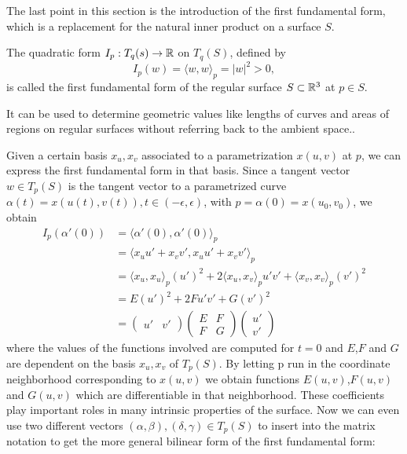 The last point in this section is the introduction of the first fundamental form, which is a replacement for the natural inner product on a surface $S$.
\begin{mydef}
	The quadratic form $I_p : T_q(s) \rightarrow \mathbb{R}$ on $T_q(S)$, defined by
	$$I_p(w) =  \langle w,w\rangle_p = |w|^2 > 0,$$
	is called the first fundamental form of the regular surface $S\subset\mathbb{R}^3$ at $p\in S$.
\end{mydef}
It can be used to determine geometric values like lengths of curves and areas of regions on regular surfaces without referring back to the ambient space..

Given a certain basis ${x_u, x_v}$ associated to a parametrization $x(u,v)$ at $p$, we can express the first fundamental form in that basis.
Since a tangent vector $w\in T_p(S)$ is the tangent vector to a parametrized curve $\alpha(t) = x(u(t),v(t)), t\in (-\epsilon,\epsilon)$, with $p = \alpha(0) = x(u_0,v_0)$, we obtain
\begin{align*}
	I_p(\alpha'(0)) &= \langle \alpha'(0),\alpha'(0)\rangle_p \\
					&= \langle x_u u' + x_v v',x_u u' + x_v v' \rangle_p \\
					&= \langle x_u ,x_u \rangle_p  (u')^2 + 2\langle x_u ,x_v \rangle_p u' v' + \langle x_v ,x_v \rangle_p (v')^2 \\
					&= E(u')^2 + 2Fu'v'+G(v')^2 \\
					&= \begin{pmatrix} u' & v' \end{pmatrix} \begin{pmatrix} E & F \\ F & G \end{pmatrix} \begin{pmatrix}u' \\ v'\end{pmatrix}
\end{align*}
where the values of the functions involved are computed for $t = 0$ and $E$,$F$ and $G$ are dependent on the basis ${x_u,x_v}$ of $T_p(S)$.
By letting p run in the coordinate neighborhood corresponding to $x(u,v)$ we obtain functions $E(u,v)$,$F(u,v)$ and $G(u,v)$ which are differentiable in that neighborhood.
These coefficients play important roles in many intrinsic properties of the surface.
Now we can even use two different vectors $(\alpha,\beta), (\delta,\gamma) \in T_p(S)$ to insert into the matrix notation to get the more general bilinear form of the first fundamental form:
